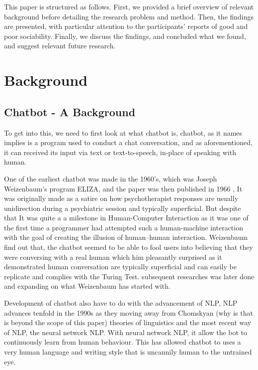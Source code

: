 \documentclass{vgtc}                          %
\begin{document}
This paper is structured as follows. First, we provided a brief overview of relevant background before detailing the research problem and method. Then, the findings are presented, with particular attention to the participants’ reports of good and poor sociability. Finally, we discuss the findings, and concluded what we found, and suggest relevant future research.


\section{Background}
\subsection{Chatbot - A Background}
To get into this, we need to first look at what chatbot is, chatbot, as it names implies is a program used to conduct a chat conversation, and as aforementioned, it can received its input via text or text-to-speech, in-place of speaking with human.

One of the earliest chatbot was made in the 1960's, which was Joseph Weizenbaum's program ELIZA, and the paper was then published in 1966 \cite{10.1145/365153.365168}, It was originally made as a satire on how psychotherapist responses are usually unidirection during a psychiatric session and typically superficial. But despite that It was quite a a milestone in Human-Computer Interaction as it was one of the first time a programmer had attempted such a human-machine interaction with the goal of creating the illusion of human–human interaction. Weizenbaum find out that, the chatbot seemed to be able to fool users into believing that they were conversing with a real human which him pleasantly surprised as it demonstrated human conversation are typically superficial and can easily be replicate and complies with the Turing Test. subsequent researches was later done and expanding on what Weizenbaum has started with.

Development of chatbot also have to do with the advancement of NLP, NLP advances tenfold in the 1990s as they moving away from Chomskyan (why is that is beyond the scope of this paper) theories of linguistics and the most recent way of NLP, the neural network NLP. With neural network NLP, it allow the bot to continuously learn from human behaviour. This has allowed chatbot to uses a very human language and writing style that is uncannily human to the untrained eye. 
\end{document}
